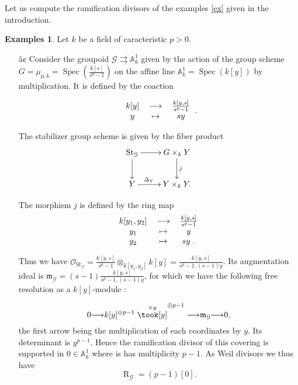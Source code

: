 \documentclass{amsart}
\theoremstyle{definition}
\newtheorem{exams}{Examples}[section]
\theoremstyle{remark}
\begin{document}
Let us compute the ramification divisors of the examples \ref{ex} given in the introduction. 

\begin{exams}

Let $k$ be a field of caracteristic $p > 0$.

\begin{itemize}

\item[â¢] Consider the groupoid ${{\mathcal G}} {\rightrightarrows} {\mathbb{A}}^1_k$ given by the action of the group scheme $G = \mu_{p,k} = \operatorname{Spec}( \frac{k[s]}{s^p -1} )$ on the affine line ${\mathbb{A}}^1_k = \operatorname{Spec}(k[y])$ by multiplication. It is defined by the coaction 

\[ \begin{tabular}{ccc}
 
$k[y]$ & ${\longrightarrow}$ & $\frac{k[y,s]}{s^p-1}$ \\ 
 
$y$ & $\mapsto$ & $sy$ \\ 
 
\end{tabular}. \]

The stabilizer group scheme is given by the fiber product \[ \xymatrix{\operatorname{St}_{{\mathcal G}} \ar[r] \ar[d] & G \times_k Y \ar[d]^-j \\ Y \ar[r]^-{\Delta_Y} & Y \times_k Y.} \] 

The morphism $j$ is defined by the ring map \[ \begin{tabular}{ccc}

$k[y_1,y_2]$ & ${\longrightarrow}$ & $\frac{k[y,s]}{s^p-1}$ \\ 

$y_1$ & $\mapsto$ & $y$ \\ 

$y_2$ & $\mapsto$ & $sy$ .\\
\end{tabular} \]

Thus we have ${{\mathcal O}}_{\operatorname{St}_{{\mathcal G}}} = \frac{k[y,s]}{s^p-1} \otimes_{k[y_1,y_2]} k[y] = \frac{k[y,s]}{s^p-1,(s-1)y}$. Its augmentation ideal is ${{\mathfrak m}}_{{\mathcal G}} = (s-1)\frac{k[y,s]}{s^p-1,(s-1)y}$, for which we have the following free resolution as a $k[y]$-module : 

\[ 0 {\longrightarrow} k[y]^{\oplus p-1} \stackrel{\times y}\took[y]^{\oplus p-1} {\longrightarrow} {{\mathfrak m}}_{{\mathcal G}} {\longrightarrow} 0 ,\] the first arrow being the multiplication of each coordinates by $y$. Its determinant is $y^{p-1}$. Hence the ramification divisor of this covering is supported in $0 \in {\mathbb{A}}^1_k$ where is has multiplicity $p-1$. As Weil divisors we thus have \[ \operatorname{R}_{{\mathcal G}} = (p-1) [0]. \]


\end{itemize}
\end{exams}
\end{document}

